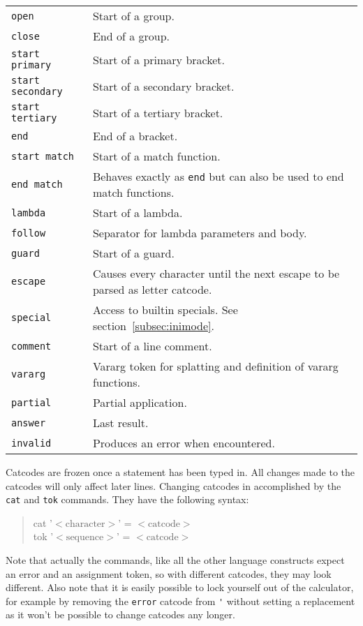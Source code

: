 \documentclass[10pt]{article}
\newcommand{\argument}[1]{{${\big<}\mathrm{#1}{\big>}$}}
\newenvironment{code}{\begin{quote}\ttfamily}{\end{quote}}
\begin{document}
\begin{longtable}{p{}p{}}
        \verb|open|            & Start of a group. \\
        \verb|close|           & End of a group. \\
        \verb|start primary|   & Start of a primary bracket. \\
        \verb|start secondary| & Start of a secondary bracket. \\
        \verb|start tertiary|  & Start of a tertiary bracket. \\
        \verb|end|             & End of a bracket. \\
        \verb|start match|     & Start of a match function. \\
        \verb|end match|       & Behaves exactly as \verb|end| but can also be used to end match functions. \\
        \verb|lambda|          & Start of a lambda. \\
        \verb|follow|          & Separator for lambda parameters and body. \\
        \verb|guard |          & Start of a guard. \\
        \verb|escape|          & Causes every character until the next escape to be parsed as letter catcode. \\
        \verb|special|         & Access to builtin specials. See section~\ref{subsec:inimode}. \\
        \verb|comment|         & Start of a line comment. \\
        \verb|vararg|          & Vararg token for splatting and definition of vararg functions. \\
        \verb|partial|         & Partial application. \\
        \verb|answer|          & Last result. \\
        \verb|invalid|         & Produces an error when encountered. \\
    \end{longtable}
    Catcodes are frozen once a statement has been typed in.
    All changes made to the catcodes will only affect later lines.
    Changing catcodes in accomplished by the \verb|cat| and \verb|tok| commands.
    They have the following syntax:
    \begin{code}
        cat '\argument{character}' = \argument{catcode} \\
        tok '\argument{sequence}' = \argument{catcode}
    \end{code}
    Note that actually the commands, like all the other language constructs expect an error and an assignment token, so with different catcodes, they may look different.
    Also note that it is easily possible to lock yourself out of the calculator, for example by removing the \verb|error| catcode from \verb|'| without setting a replacement as it won't be possible to change catcodes any longer.
    
\end{document}
